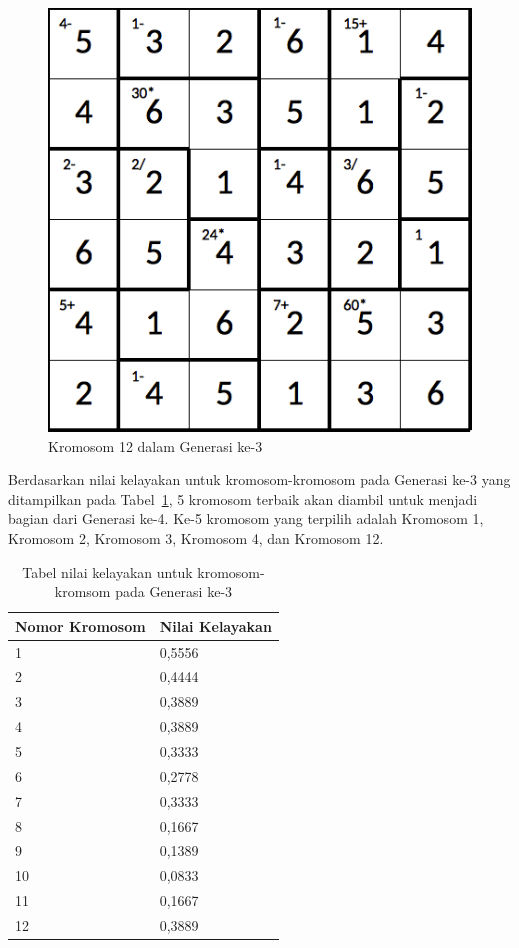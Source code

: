 \documentclass[a4paper,twoside]{article}
\begin{document}
\begin{enumerate}
\begin{figure}
\centering
\captionsetup{justification=centering}
\includegraphics[scale=0.333]{Gambar/hybridgenetic/Generation3Chromosome12}
\caption[Kromosom 12 dalam Generasi ke-3]{Kromosom 12 dalam Generasi ke-3}
\label{fig:analisisg3k12}
\end{figure}

\clearpage

Berdasarkan nilai kelayakan untuk kromosom-kromosom pada Generasi ke-3 yang ditampilkan pada Tabel~\ref{tab:analisishg4}, 5 kromosom terbaik akan diambil untuk menjadi bagian dari Generasi ke-4. Ke-5 kromosom yang terpilih adalah Kromosom 1, Kromosom 2, Kromosom 3, Kromosom 4, dan Kromosom 12.

\begin{table}
\centering
\captionsetup{justification=centering}
\begin{tabular}{| l | l |}
\hline
Nomor Kromosom & Nilai Kelayakan \\
\hline \hline
1 & 0,5556 \\
\hline
2 & 0,4444 \\
\hline
3 & 0,3889 \\
\hline
4 & 0,3889 \\
\hline
5 & 0,3333 \\
\hline
6 & 0,2778 \\
\hline
7 & 0,3333 \\
\hline
8 & 0,1667 \\
\hline
9 & 0,1389 \\
\hline
10 & 0,0833 \\
\hline
11 & 0,1667 \\
\hline
12 & 0,3889 \\
\hline
\end{tabular}
\caption[Tabel nilai kelayakan untuk kromosom-kromsom pada Generasi ke-3]{Tabel nilai kelayakan untuk kromosom-kromsom pada Generasi ke-3}
\label{tab:analisishg4}
\end{table}


\end{enumerate}
\end{document}
